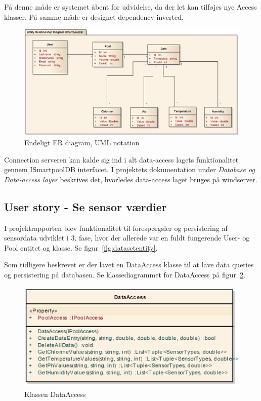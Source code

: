 På denne måde er systemet åbent for udvidelse, da der let kan tilføjes nye Access klasser. På samme måde er designet dependency inverted.

\begin{figure}[h]
	\centering
	\includegraphics[width=\linewidth]{figs/design/databaseERD_final_uml}
	\caption{Endeligt ER diagram, UML notation}
	\label{fig:databaseERD_final_uml}
\end{figure}

Connection serveren kan kalde sig ind i alt data-access lagets funktionalitet gennem ISmartpoolDB interfacet. I projektets dokumentation under \textit{Database og Data-access layer} beskrives det, hvorledes data-access laget bruges på \gls{windserver}.

\subsection{User story - Se sensor værdier}

I projektrapporten blev funktionalitet til forespørgsler og persistering af sensordata udviklet i 3. fase, hvor der allerede var en fuldt fungerende User- og Pool entitet og klasse. Se figur~\ref{fig:datasetentity}.

Som tidligere beskrevet er der lavet en DataAccess klasse til at lave data queries og persistering på databasen. Se klassediagrammet for DataAccess på figur~\ref{fig:dataAccess}.
	
\begin{figure}[h]
\centering
\includegraphics[width=0.7\linewidth]{figs/database/dataAccess}
\caption{Klassen DataAccess}
\label{fig:dataAccess}
\end{figure}

